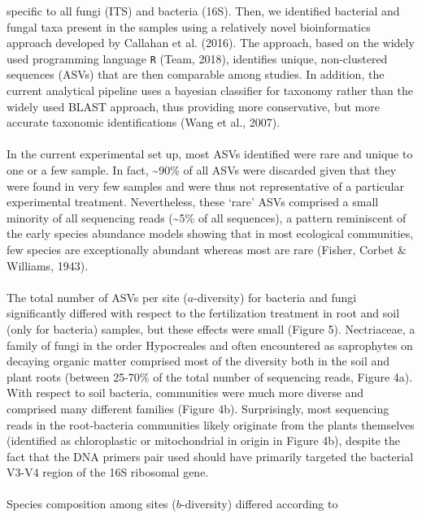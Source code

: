 \documentclass[11pt,]{article}
\begin{document}
specific to all fungi (ITS) and bacteria (16S). Then, we identified
bacterial and fungal taxa present in the samples using a relatively
novel bioinformatics approach developed by Callahan et al. (2016). The
approach, based on the widely used programming language \texttt{R}
(Team, 2018), identifies unique, non-clustered sequences (ASVs) that are
then comparable among studies. In addition, the current analytical
pipeline uses a bayesian classifier for taxonomy rather than the widely
used BLAST approach, thus providing more conservative, but more accurate
taxonomic identifications (Wang et al., 2007).\\
\hspace*{0.333em}\\
In the current experimental set up, most ASVs identified were rare and
unique to one or a few sample. In fact, \textasciitilde{}90\% of all
ASVs were discarded given that they were found in very few samples and
were thus not representative of a particular experimental treatment.
Nevertheless, these `rare' ASVs comprised a small minority of all
sequencing reads (\textasciitilde{}5\% of all sequences), a pattern
reminiscent of the early species abundance models showing that in most
ecological communities, few species are exceptionally abundant whereas
most are rare (Fisher, Corbet \& Williams, 1943).\\
\hspace*{0.333em}\\
The total number of ASVs per site (\(a\)-diversity) for bacteria and
fungi significantly differed with respect to the fertilization treatment
in root and soil (only for bacteria) samples, but these effects were
small (Figure 5). Nectriaceae, a family of fungi in the order
Hypocreales and often encountered as saprophytes on decaying organic
matter comprised most of the diversity both in the soil and plant roots
(between 25-70\% of the total number of sequencing reads, Figure 4a).
With respect to soil bacteria, communities were much more diverse and
comprised many different families (Figure 4b). Surprisingly, most
sequencing reads in the root-bacteria communities likely originate from
the plants themselves (identified as chloroplastic or mitochondrial in
origin in Figure 4b), despite the fact that the DNA primers pair used
should have primarily targeted the bacterial V3-V4 region of the 16S
ribosomal gene.\\
\hspace*{0.333em}\\
Species composition among sites (\(b\)-diversity) differed according to
\end{document}

